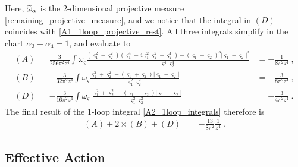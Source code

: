 \documentclass[11pt]{amsart}
\numberwithin{equation}{section}
\numberwithin{figure}{section}
\numberwithin{table}{section}
\begin{document}
Here, $\widetilde{\omega}_\alpha$ is the 2-dimensional projective measure \cref{remaining_projective_measure}, and we notice that the integral in $(D)$ coincides with \cref{A1_1loop_projective_rest}.
All three integrals simplify in the chart $\alpha_3+\alpha_4=1$, and evaluate to
\begin{align*}
	(A) && \frac{3}{256\pi^2 z^4} \int \omega_\varsigma \frac{(\varsigma_1^2+\varsigma_2^2)(\varsigma_1^4 - 4 \varsigma_1^2 \varsigma_2^2 + \varsigma_2^4) - (\varsigma_1+\varsigma_2)^3 |\varsigma_1-\varsigma_2|^3}{\varsigma_1^4 \varsigma_2^4} &=-\frac{1}{8\pi^2 z^4}~, \\
 (B) & 	&-\frac{3}{32 \pi^2 z^4} \int \omega_\varsigma \frac{\varsigma_1^2 + \varsigma_2^2 - (\varsigma_1+\varsigma_2) |\varsigma_1-\varsigma_2|}{\varsigma_1^2 \varsigma_2^2}  &= -\frac{3}{8\pi^2 z^4}~, \\
 (D) &  & -\frac{3}{16 \pi^2 z^4} \int \omega_\varsigma \; \frac{\varsigma_1^2 + \varsigma_2^2 - (\varsigma_1+\varsigma_2)|\varsigma_1-\varsigma_2|}{\varsigma_1^2 \varsigma_2^2} &= -\frac{3}{4\pi^2 z^4}~.
\end{align*}
The final result of the 1-loop integral \cref{A2_1loop_integrals} therefore is 
\begin{align*}
	(A) + 2\times (B) + (D) &= -\frac{13}{8\pi^2} \frac{1}{z^4}~.
\end{align*}

\subsection{Effective Action}\label{app:EffectiveAction}
\end{document}
